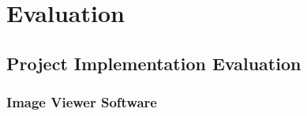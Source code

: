 \chapter{Evaluation}






\section{Project Implementation Evaluation}
\subsection{Image Viewer Software}


